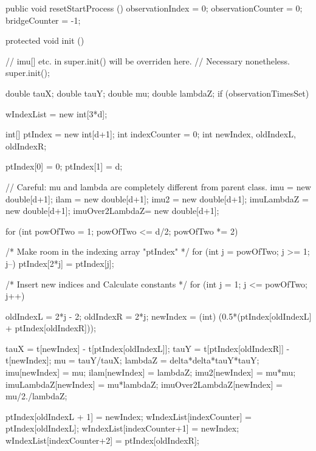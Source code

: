 \begin{code}\begin{hide}

   public void resetStartProcess () {
        observationIndex   = 0;
        observationCounter = 0;
        bridgeCounter = -1;
    }


    protected void init () {
        // imu[] etc. in super.init() will be overriden here.
        // Necessary nonetheless.
        super.init();

        double tauX;
        double tauY;
        double mu;
        double lambdaZ;
        if (observationTimesSet) {
            wIndexList  = new int[3*d];

            int[] ptIndex = new int[d+1];
            int   indexCounter = 0;
            int   newIndex, oldIndexL, oldIndexR;

            ptIndex[0] = 0;
            ptIndex[1] = d;

            // Careful: mu and lambda are completely different from parent class.
            imu            = new double[d+1];
            ilam           = new double[d+1];
            imu2           = new double[d+1];
            imuLambdaZ     = new double[d+1];
            imuOver2LambdaZ= new double[d+1];

            for (int powOfTwo = 1; powOfTwo <= d/2; powOfTwo *= 2) {
                /* Make room in the indexing array "ptIndex" */
                for (int j = powOfTwo; j >= 1; j--) ptIndex[2*j] = ptIndex[j];

                /* Insert new indices and Calculate constants */
                for (int j = 1; j <= powOfTwo; j++) {
                    oldIndexL = 2*j - 2;
                    oldIndexR = 2*j;
                    newIndex  = (int) (0.5*(ptIndex[oldIndexL] + ptIndex[oldIndexR]));

                    tauX      = t[newIndex] - t[ptIndex[oldIndexL]];
                    tauY      = t[ptIndex[oldIndexR]] - t[newIndex];
                    mu        = tauY/tauX;
                    lambdaZ   = delta*delta*tauY*tauY;
                    imu[newIndex]    = mu;
                    ilam[newIndex]   = lambdaZ;
                    imu2[newIndex]   = mu*mu;
                    imuLambdaZ[newIndex]      = mu*lambdaZ;
                    imuOver2LambdaZ[newIndex] = mu/2./lambdaZ;

                    ptIndex[oldIndexL + 1]       = newIndex;
                    wIndexList[indexCounter]   = ptIndex[oldIndexL];
                    wIndexList[indexCounter+1] = newIndex;
                    wIndexList[indexCounter+2] = ptIndex[oldIndexR];

}}}}
\end{hide}
\end{code}

